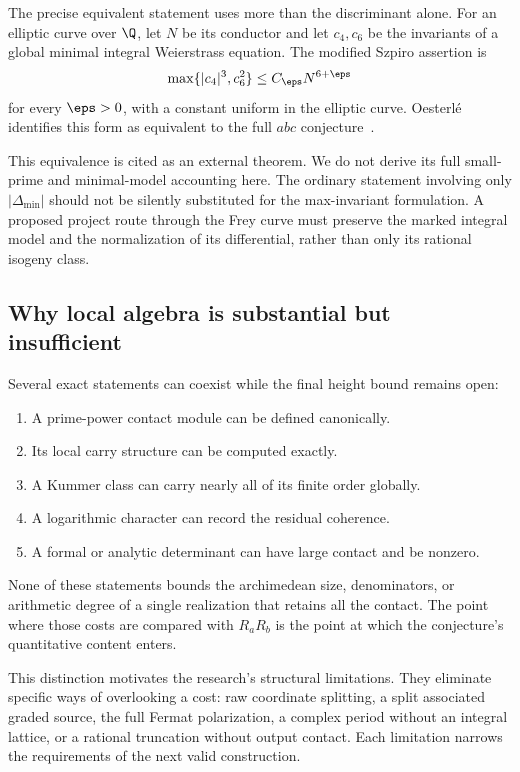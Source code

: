 The precise equivalent statement uses more than the discriminant alone. For an elliptic curve over $\Q$, let $N$ be its conductor and let $c_4,c_6$ be the invariants of a global minimal integral Weierstrass equation. The modified Szpiro assertion is
\[
 \max\{|c_4|^3,c_6^2\}\le C_\eps N^{6+\eps}
\]
for every $\eps>0$, with a constant uniform in the elliptic curve. Oesterl\'e identifies this form as equivalent to the full $abc$ conjecture~\cite{Oesterle1988}.

This equivalence is cited as an external theorem. We do not derive its full small-prime and minimal-model accounting here. The ordinary statement involving only $|\Delta_{\min}|$ should not be silently substituted for the max-invariant formulation. A proposed project route through the Frey curve must preserve the marked integral model and the normalization of its differential, rather than only its rational isogeny class.

\subsection{Why local algebra is substantial but insufficient}
Several exact statements can coexist while the final height bound remains open:
\begin{enumerate}
\item A prime-power contact module can be defined canonically.
\item Its local carry structure can be computed exactly.
\item A Kummer class can carry nearly all of its finite order globally.
\item A logarithmic character can record the residual coherence.
\item A formal or analytic determinant can have large contact and be nonzero.
\end{enumerate}
None of these statements bounds the archimedean size, denominators, or arithmetic degree of a single realization that retains all the contact. The point where those costs are compared with $R_aR_b$ is the point at which the conjecture's quantitative content enters.

This distinction motivates the research's structural limitations. They eliminate specific ways of overlooking a cost: raw coordinate splitting, a split associated graded source, the full Fermat polarization, a complex period without an integral lattice, or a rational truncation without output contact. Each limitation narrows the requirements of the next valid construction.

